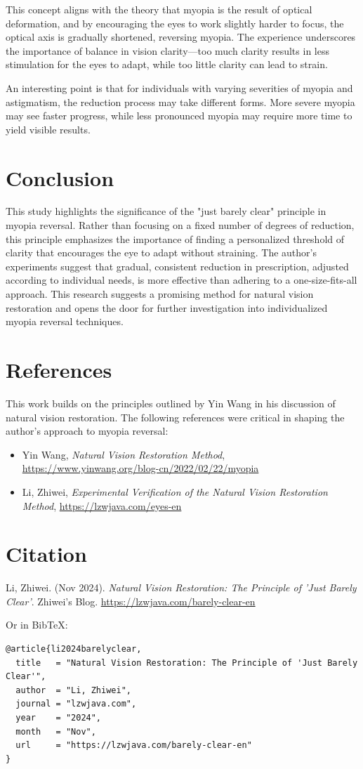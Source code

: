 \documentclass[12pt]{article}
\begin{document}
This concept aligns with the theory that myopia is the result of optical deformation, and by encouraging the eyes to work slightly harder to focus, the optical axis is gradually shortened, reversing myopia. The experience underscores the importance of balance in vision clarity—too much clarity results in less stimulation for the eyes to adapt, while too little clarity can lead to strain.

An interesting point is that for individuals with varying severities of myopia and astigmatism, the reduction process may take different forms. More severe myopia may see faster progress, while less pronounced myopia may require more time to yield visible results.

\section{Conclusion}
This study highlights the significance of the "just barely clear" principle in myopia reversal. Rather than focusing on a fixed number of degrees of reduction, this principle emphasizes the importance of finding a personalized threshold of clarity that encourages the eye to adapt without straining. The author’s experiments suggest that gradual, consistent reduction in prescription, adjusted according to individual needs, is more effective than adhering to a one-size-fits-all approach. This research suggests a promising method for natural vision restoration and opens the door for further investigation into individualized myopia reversal techniques.

\section*{References}
This work builds on the principles outlined by Yin Wang in his discussion of natural vision restoration. The following references were critical in shaping the author’s approach to myopia reversal:
\begin{itemize}
    \item Yin Wang, \textit{Natural Vision Restoration Method}, \url{https://www.yinwang.org/blog-cn/2022/02/22/myopia}
    \item Li, Zhiwei, \textit{Experimental Verification of the Natural Vision Restoration Method}, \url{https://lzwjava.com/eyes-en}
\end{itemize}

\section*{Citation}
Li, Zhiwei. (Nov 2024). \textit{Natural Vision Restoration: The Principle of 'Just Barely Clear'}. Zhiwei's Blog. \url{https://lzwjava.com/barely-clear-en}

Or in BibTeX:
\begin{verbatim}
@article{li2024barelyclear,
  title   = "Natural Vision Restoration: The Principle of 'Just Barely Clear'",
  author  = "Li, Zhiwei",
  journal = "lzwjava.com",
  year    = "2024",
  month   = "Nov",
  url     = "https://lzwjava.com/barely-clear-en"
}
\end{verbatim}
\end{document}
